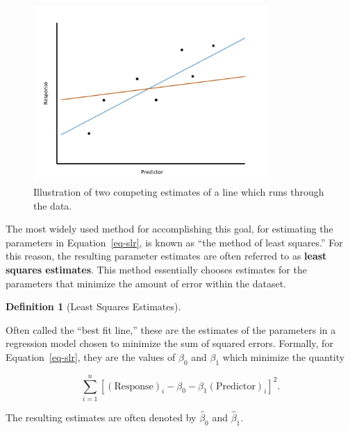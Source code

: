 \documentclass[
  letterpaper,
  DIV=11,
  numbers=noendperiod]{scrreprt}
\theoremstyle{definition}
\newtheorem{definition}{Definition}[chapter]
\theoremstyle{definition}
\theoremstyle{plain}
\theoremstyle{remark}
\begin{document}
\begin{figure}

{\centering \includegraphics[width=0.8\textwidth,height=\textheight]{./images/RegModel-LeastSquares.jpg}

}

\caption{\label{fig-regmodel-least-squares}Illustration of two competing
estimates of a line which runs through the data.}

\end{figure}

The most widely used method for accomplishing this goal, for estimating
the parameters in Equation~\ref{eq-slr}, is known as ``the method of
least squares.'' For this reason, the resulting parameter estimates are
often referred to as \textbf{least squares estimates}. This method
essentially chooses estimates for the parameters that minimize the
amount of error within the dataset.

\begin{definition}[Least Squares
Estimates]\protect\hypertarget{def-least-squares-estimates}{}\label{def-least-squares-estimates}

Often called the ``best fit line,'' these are the estimates of the
parameters in a regression model chosen to minimize the sum of squared
errors. Formally, for Equation~\ref{eq-slr}, they are the values of
\(\beta_0\) and \(\beta_1\) which minimize the quantity

\[\sum_{i=1}^n \left[(\text{Response})_i - \beta_0 - \beta_1(\text{Predictor})_{i}\right]^2.\]

The resulting estimates are often denoted by \(\widehat{\beta}_0\) and
\(\widehat{\beta}_1\).

\end{definition}
\end{document}
